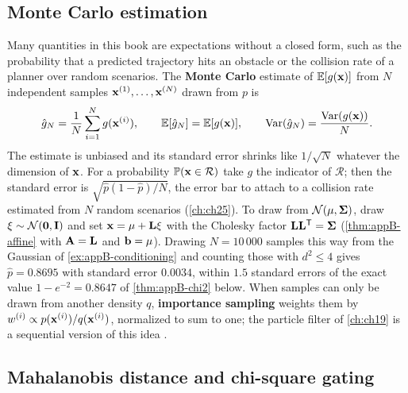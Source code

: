 \subsection{Monte Carlo estimation}
\label{sec:appB-montecarlo}

Many quantities in this book are expectations without a closed form, such
as the probability that a predicted trajectory hits an obstacle or the
collision rate of a planner over random scenarios. The \textbf{Monte
Carlo} estimate of $\mathbb{E}[g(\mathbf{x})]$ from $N$
independent samples $\mathbf{x}^{(1)}, \dots, \mathbf{x}^{(N)}$ drawn from $p$ is
\begin{equation}
  \hat{g}_N = \frac1N\sum_{i=1}^{N} g(\mathbf{x}^{(i)}),\qquad
  \mathbb{E}[\hat{g}_N] = \mathbb{E}[g(\mathbf{x})],\qquad
  \operatorname{Var}(\hat{g}_N) = \frac{\operatorname{Var}(g(\mathbf{x}))}{N} .
  \label{eq:appB-montecarlo}
\end{equation}
The estimate is unbiased and its standard error shrinks like $1/\sqrt{N}$
whatever the dimension of $\mathbf{x}$. For a probability $\mathbb{P}(\mathbf{x} \in
\mathcal{R})$ take $g$ the indicator of $\mathcal{R}$; then the standard error
is $\sqrt{\hat{p}(1-\hat{p})/N}$, the error bar to attach to a collision rate
estimated from $N$ random scenarios (\cref{ch:ch25}). To draw from
$\mathcal{N}(\mathbf{\mu}, \mathbf{\Sigma})$, draw $\mathbf{\xi} \sim \mathcal{N}(\mathbf{0},
\mathbf{I})$ and set $\mathbf{x} = \mathbf{\mu} + \mathbf{L}\mathbf{\xi}$ with the Cholesky
factor $\mathbf{L}\mathbf{L}^{\mathsf{T}} = \mathbf{\Sigma}$ (\cref{thm:appB-affine} with
$\mathbf{A} = \mathbf{L}$ and $\mathbf{b} = \mathbf{\mu}$). Drawing $N = 10\,000$ samples this way from the Gaussian of \cref{ex:appB-conditioning} and counting those with $d^2 \le 4$ gives $\hat{p} = 0.8695$ with standard error $0.0034$, within $1.5$ standard errors of the exact value $1 - e^{-2} = 0.8647$ of \cref{thm:appB-chi2} below.
When samples can only be drawn from another density $q$, \textbf{importance
sampling} weights them by $w^{(i)} \propto
p(\mathbf{x}^{(i)})/q(\mathbf{x}^{(i)})$, normalized to sum to one; the particle
filter of \cref{ch:ch19} is a sequential version of this idea
\cite{doucet2001sequential}.

\subsection{Mahalanobis distance and chi-square gating}
\label{sec:appB-gating}

